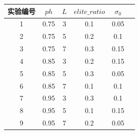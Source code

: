 \documentclass{wzuthesis}
\begin{document}
\begin{table}[htbp]
  \centering
  \label{tb:IHHO-sensitivity-settings}
  \begin{tabular}{cccccc} %
    \toprule
    实验编号 & $ph$ & $L$ & $elite\_ratio$ & $\sigma_0$ \\
    \midrule
    1 & 0.75 & 3 & 0.1 & 0.05 \\
    2 & 0.75 & 5 & 0.2 & 0.1 \\
    3 & 0.75 & 7 & 0.3 & 0.15 \\
    4 & 0.85 & 3 & 0.2 & 0.15 \\
    5 & 0.85 & 5 & 0.3 & 0.05 \\
    6 & 0.85 & 7 & 0.1 & 0.1 \\
    7 & 0.95 & 3 & 0.3 & 0.1 \\
    8 & 0.95 & 5 & 0.1 & 0.15 \\
    9 & 0.95 & 7 & 0.2 & 0.05 \\
    \bottomrule
  \end{tabular}
\end{table}
\end{document}
